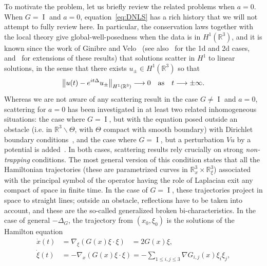 \documentclass[10pt]{amsart}
\theoremstyle{definition}\newtheorem{defi}[theo]{Definition}\newtheorem{rema}[theo]{Remark}\newtheorem{exam}[theo]{Example}\newtheorem{exem}[theo]{Example}\newtheorem{nota}[theo]{Notation}
\newcommand*\R{\mathbb{R}}
\DeclareMathOperator{\I}{I}
\renewcommand*{\to}{\mathchoice{\longrightarrow}{\rightarrow}{\rightarrow}{\rightarrow}}
\begin{document}
To motivate the problem, let us briefly review the related problems when $a=0$. When $G = \I$ and $a = 0$, equation~\eqref{eq:DNLS} has a rich history that we will not attempt to fully review here. In particular, the conservation laws together with the local theory give global-well-posedness when the data is in $H^1(\R^3)$, and it is known since the work of Ginibre and Velo~\cite{GV85scat} (see also~\cite{Naka} for the 1d and 2d cases, and~\cite{Vi09} for extensions of these results) that solutions scatter in $H^1$ to linear solutions, in the sense that there exists $u_\pm \in H^1(\R^3)$ so that
\[
\left\| u(t) - e^{it\Delta} u_\pm \right\|_{H^1(\R^3)} \to 0 \quad\text{as}\quad t \to \pm\infty.
\]
Whereas we are not aware of any scattering result in the case $G \neq \I$ and $a=0$, scattering for $a=0$ has been investigated in at least two related inhomogeneous situations: the case where $G = \I$, but with the equation posed outside an obstacle (i.e. in $\R^3 \backslash \Theta$, with $\Theta$ compact with smooth boundary) with Dirichlet boundary conditions~\cite{Ab15,IvPl10, KiViXi16a, KiViXi16b,PV1,PV2,BiTeQi22}, and the case where $G = \I$, but a perturbation $Vu$ by a potential is added~\cite{BaVi16,FoVi18, Ho16, La16}. In both cases, scattering results rely crucially on strong \emph{non-trapping} conditions. The most general version of this condition states that all the Hamiltonian trajectories (these are parametrized curves in $\R_x^3 \times \R_\xi^3$) associated with the principal symbol of the operator having the role of Laplacian exit any compact of space in finite time. In the case of $G=\I$, these trajectories project in space to straight lines; outside an obstacle, reflections have to be taken into account, and these are the so-called generalized broken bi-characteristics. In the case of general $-\Delta_G$, the trajectory from $(x_0, \xi_0)$ is the solutions of the Hamilton equation
\begin{equation}\label{eq:Ham}
\begin{split}
\dot x(t) &= \nabla_\xi(G(x) \xi \cdot \xi) \;\;\;= 2 G(x) \xi, \\
\dot \xi(t) &= - \nabla_{x} (G(x) \xi \cdot \xi) = - \sum_{1\leq i, j \leq 3} \nabla G_{i,j}(x) \xi_i \xi_j,
\end{split}
\end{equation}
\end{document}
